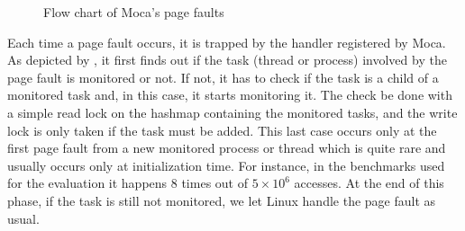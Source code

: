 
\begin{figure}[htb]
    \centering
    
    \caption{Flow chart of Moca's page faults}
    \label{fig:fpf-flow}
\end{figure}

Each time a page fault occurs, it is trapped by the handler registered by \gls{Moca}.
As depicted by , it first finds out if the task (thread or process) involved by the page fault is monitored or not.
If not, it has to check if the task is a child of a monitored task and, in this case, it starts monitoring it.
The check be done with a simple read lock on the hashmap containing the monitored tasks, and the write lock is only taken if the task must be added.
This last case occurs only at the first page fault from a new monitored process or thread which is quite rare and usually occurs only at initialization time.
For instance, in the benchmarks used for the evaluation it happens $8$ times out of $5\times10^6$ accesses.
At the end of this phase, if the task is still not monitored, we let Linux handle the page fault as usual.

